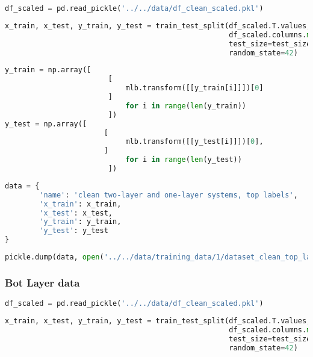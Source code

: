 \begin{lstlisting}[language=Python]
df_scaled = pd.read_pickle('../../data/df_clean_scaled.pkl')
\end{lstlisting}

\begin{lstlisting}[language=Python]
x_train, x_test, y_train, y_test = train_test_split(df_scaled.T.values,
                                                    df_scaled.columns.map(lambda x: x.split('_')[0]), # first part of the filename is the top label
                                                    test_size=test_size_ratio,
                                                    random_state=42)
\end{lstlisting}

\begin{lstlisting}[language=Python]
y_train = np.array([    
                        [
                            mlb.transform([[y_train[i]]])[0]
                        ] 
                            for i in range(len(y_train))
                        ])
y_test = np.array([ 
                       [
                            mlb.transform([[y_test[i]]])[0],
                       ] 
                            for i in range(len(y_test))
                        ])
\end{lstlisting}

\begin{lstlisting}[language=Python]
data = {
        'name': 'clean two-layer and one-layer systems, top labels',
        'x_train': x_train,
        'x_test': x_test,
        'y_train': y_train,
        'y_test': y_test
}
\end{lstlisting}

\begin{lstlisting}[language=Python]
pickle.dump(data, open('../../data/training_data/1/dataset_clean_top_layer.pkl', 'wb'))
\end{lstlisting}

\hypertarget{bot-layer-data-2}{%
\subsubsection{Bot Layer data}\label{bot-layer-data-2}}

\begin{lstlisting}[language=Python]
df_scaled = pd.read_pickle('../../data/df_clean_scaled.pkl')
\end{lstlisting}

\begin{lstlisting}[language=Python]
x_train, x_test, y_train, y_test = train_test_split(df_scaled.T.values,
                                                    df_scaled.columns.map(lambda x: x.split('_')[1]), # second part of the filename is the bot label
                                                    test_size=test_size_ratio,
                                                    random_state=42)
\end{lstlisting}

